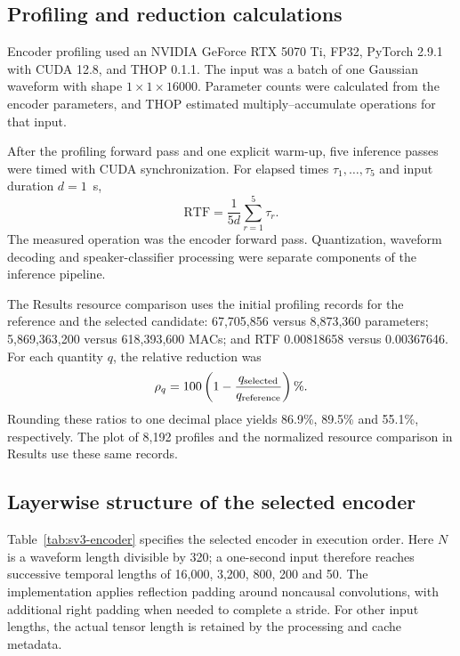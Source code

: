 \subsection{Profiling and reduction calculations}
Encoder profiling used an NVIDIA GeForce RTX 5070 Ti, FP32, PyTorch 2.9.1 with CUDA 12.8, and THOP 0.1.1. The input was a batch of one Gaussian waveform with shape $1\times1\times16000$. Parameter counts were calculated from the encoder parameters, and THOP estimated multiply--accumulate operations for that input.

After the profiling forward pass and one explicit warm-up, five inference passes were timed with CUDA synchronization. For elapsed times $\tau_1,\ldots,\tau_5$ and input duration $d=1$~s,
\begin{equation}
 \mathrm{RTF}=\frac{1}{5d}\sum_{r=1}^{5}\tau_r.
 \label{eq:sv2-rtf}
\end{equation}
The measured operation was the encoder forward pass. Quantization, waveform decoding and speaker-classifier processing were separate components of the inference pipeline.

The Results resource comparison uses the initial profiling records for the reference and the selected candidate: 67,705,856 versus 8,873,360 parameters; 5,869,363,200 versus 618,393,600 MACs; and RTF 0.00818658 versus 0.00367646. For each quantity $q$, the relative reduction was
\begin{equation}
 \rho_q=100\left(1-\frac{q_{\rm selected}}{q_{\rm reference}}\right)\%.
 \label{eq:sv2-reduction}
\end{equation}
Rounding these ratios to one decimal place yields 86.9\%, 89.5\% and 55.1\%, respectively. The plot of 8,192 profiles and the normalized resource comparison in Results use these same records.

\subsection{Layerwise structure of the selected encoder}
Table~\ref{tab:sv3-encoder} specifies the selected encoder in execution order. Here $N$ is a waveform length divisible by 320; a one-second input therefore reaches successive temporal lengths of 16,000, 3,200, 800, 200 and 50. The implementation applies reflection padding around noncausal convolutions, with additional right padding when needed to complete a stride. For other input lengths, the actual tensor length is retained by the processing and cache metadata.

